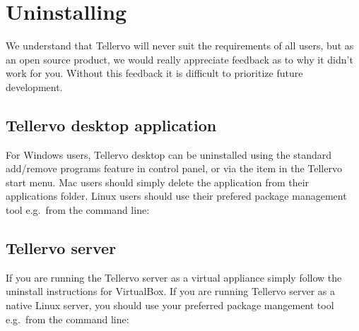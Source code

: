 \section{Uninstalling}

We understand that Tellervo will never suit the requirements of all users, but as an open source product, we would really appreciate feedback as to why it didn't work for you.  Without this feedback it is difficult to prioritize future development.

\subsection{Tellervo desktop application}
For Windows users, Tellervo desktop can be uninstalled using the standard add/remove programs feature in control panel, or via the item in the Tellervo start menu.  Mac users should simply delete the application from their applications folder.  Linux users should use their prefered package management tool e.g.\ from the command line:

\subsection{Tellervo server}


If you are running the Tellervo server as a virtual appliance simply follow the uninstall instructions for VirtualBox.  If you are running Tellervo server as a native Linux server, you should use your preferred package mangement tool e.g.\ from the command line:







